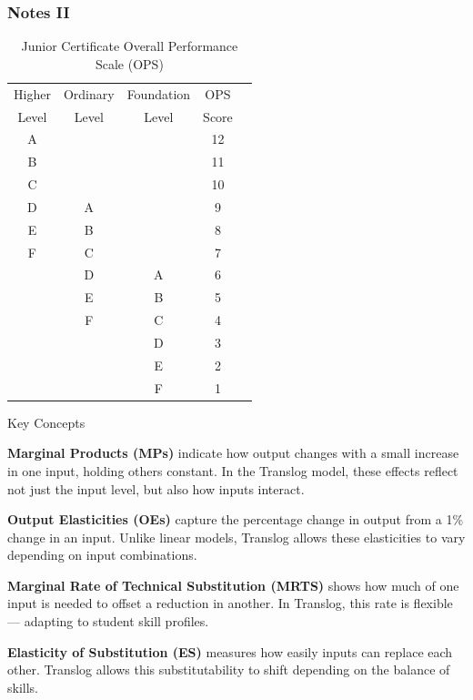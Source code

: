 \documentclass{beamer}
\begin{document}
\begin{frame}
\frametitle{Notes II}
\hypertarget{NotesII}{}

\begin{table}[htbp]
\tiny
\centering
\caption{Junior Certificate Overall Performance Scale (OPS)}
\label{tab:junior-cert-ops}
\begin{tabular}{|c|c|c|c|c}
\hline
Higher & Ordinary & Foundation & OPS \\
Level & Level & Level & Score \\
\hline
A & & & 12 \\
\hline
B & & & 11 \\
\hline
C & & & 10 \\
\hline
D & A & & 9 \\
\hline
E & B & & 8 \\
\hline
F & C & & 7 \\
\hline
& D & A & 6 \\
\hline
& E & B & 5 \\
\hline
& F & C & 4 \\
\hline
&   & D & 3 \\
\hline
&   & E & 2 \\
\hline
&   & F & 1 \\
\hline
\end{tabular}
\end{table}

\vfill
\hfill
\hyperlink{Timeline}{}
\end{frame}

\begin{frame}{Key Concepts}
\hypertarget{Key Concepts}{}

\textbf{Marginal Products (MPs)} indicate how output changes with a small increase in one input, holding others constant. In the Translog model, these effects reflect not just the input level, but also how inputs interact.

\textbf{Output Elasticities (OEs)} capture the percentage change in output from a 1\% change in an input. Unlike linear models, Translog allows these elasticities to vary depending on input combinations.

\textbf{Marginal Rate of Technical Substitution (MRTS)} shows how much of one input is needed to offset a reduction in another. In Translog, this rate is flexible — adapting to student skill profiles.

\textbf{Elasticity of Substitution (ES)} measures how easily inputs can replace each other. Translog allows this substitutability to shift depending on the balance of skills.

\vfill
\hfill
\hyperlink{NonlinearEstimation}{}
\end{frame}
\end{document}
